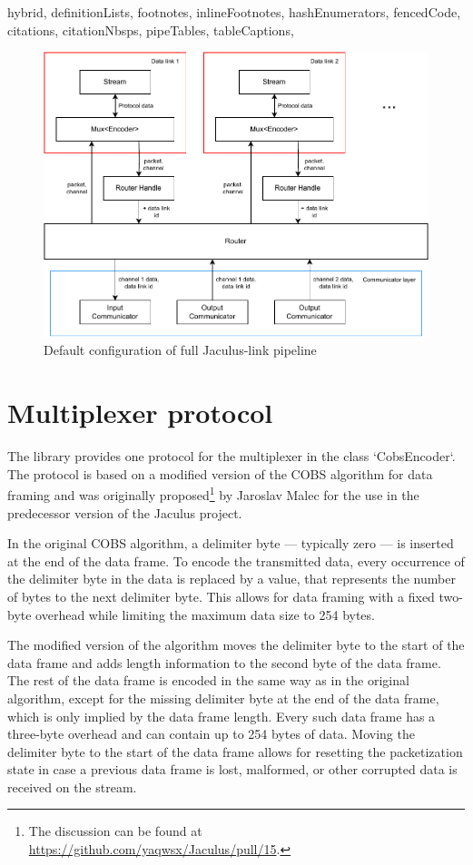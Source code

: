 \begin{markdown*}{%
  hybrid,
  definitionLists,
  footnotes,
  inlineFootnotes,
  hashEnumerators,
  fencedCode,
  citations,
  citationNbsps,
  pipeTables,
  tableCaptions,
}
\begin{figure}[!ht]
    \centering
    \includegraphics[width=\textwidth]{img/link-pipeline}
    \caption{Default configuration of full Jaculus-link pipeline}
    \label{fig:link-pipeline}
\end{figure}


\section{Multiplexer protocol}

The library provides one protocol for the multiplexer in the class `CobsEncoder`. The protocol is based on a modified version of the COBS\cite{cobs} algorithm for data framing and was originally proposed\footnote{The discussion can be found at \url{https://github.com/yaqwsx/Jaculus/pull/15}.} by Jaroslav Malec for the use in the predecessor version of the Jaculus project.

In the original COBS algorithm, a delimiter byte --- typically zero --- is inserted at the end of the data frame. To encode the transmitted data, every occurrence of the delimiter byte in the data is replaced by a value, that represents the number of bytes to the next delimiter byte. This allows for data framing with a fixed two-byte overhead while limiting the maximum data size to 254 bytes.

The modified version of the algorithm moves the delimiter byte to the start of the data frame and adds length information to the second byte of the data frame. The rest of the data frame is encoded in the same way as in the original algorithm, except for the missing delimiter byte at the end of the data frame, which is only implied by the data frame length. Every such data frame has a three-byte overhead and can contain up to 254 bytes of data. Moving the delimiter byte to the start of the data frame allows for resetting the packetization state in case a previous data frame is lost, malformed, or other corrupted data is received on the stream.


\end{markdown*}
